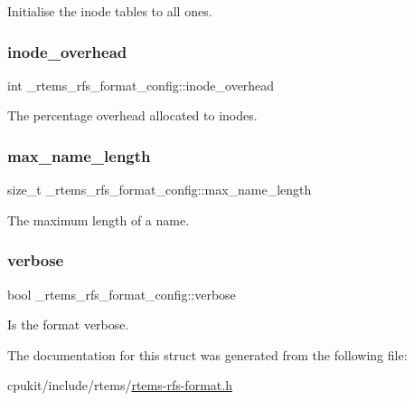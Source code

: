 Initialise the inode tables to all ones. \mbox{\label{struct__rtems__rfs__format__config_ad550027d9df06dbaa6259070b2cd191f}} 
\subsubsection{\texorpdfstring{inode\_overhead}{inode\_overhead}}
{\footnotesize\ttfamily int \+\_\+rtems\+\_\+rfs\+\_\+format\+\_\+config\+::inode\+\_\+overhead}

The percentage overhead allocated to inodes. \mbox{\label{struct__rtems__rfs__format__config_a95775a4ab39c904a0b0774046e325a6c}} 
\subsubsection{\texorpdfstring{max\_name\_length}{max\_name\_length}}
{\footnotesize\ttfamily size\+\_\+t \+\_\+rtems\+\_\+rfs\+\_\+format\+\_\+config\+::max\+\_\+name\+\_\+length}

The maximum length of a name. \mbox{\label{struct__rtems__rfs__format__config_a140bb8dfd6b1a4856f114bd6e607da48}} 
\subsubsection{\texorpdfstring{verbose}{verbose}}
{\footnotesize\ttfamily bool \+\_\+rtems\+\_\+rfs\+\_\+format\+\_\+config\+::verbose}

Is the format verbose. 

The documentation for this struct was generated from the following file\+:\begin{DoxyCompactItemize}
\item 
cpukit/include/rtems/\mbox{\hyperlink{rtems-rfs-format_8h}{rtems-\/rfs-\/format.\+h}}\end{DoxyCompactItemize}
